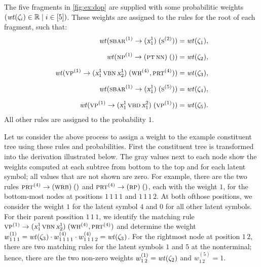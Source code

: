 \documentclass[../../document.tex]{subfiles}
\begin{document}
\begin{example}
        The five fragments in \cref{fig:ex:dop} are supplied with some probabilitic weights \((\mathit{wt}(\zeta_i) \in \mathbb{R} \mid i \in [5])\).
        These weights are assigned to the  rules for the root of each fragment, such that:
        \begin{align*}
            \mathit{wt}(\textsc{sbar}^{(1)} \to (\textsl{x}^1_1)\;(\textsc{s}^{(2)})) &= \mathit{wt}(\zeta_1), \\[.2cm]
            \mathit{wt}(\textsc{np}^{(1)} \to (\textsc{pt}\,\textsc{nn})\;()) &= \mathit{wt}(\zeta_2), \\[.2cm]
            \mathit{wt}(\textsc{vp}^{(1)} \to (\textsl{x}_1^1\,\textsc{vbn}\,\textsl{x}_2^1)\;(\textsc{wh}^{(4)}, \textsc{prt}^{(4)})) &= \mathit{wt}(\zeta_3), \\[.2cm]
            \mathit{wt}(\textsc{sbar}^{(1)} \to (\textsl{x}^1_1)\;(\textsc{s}^{(5)})) &= \mathit{wt}(\zeta_4),  \\[.2cm]
            \mathit{wt}(\textsc{vp}^{(1)} \to (\textsl{x}^1_1\,\textsc{vbd}\,\textsl{x}_1^2)\;(\textsc{vp}^{(1)})) &= \mathit{wt}(\zeta_5) \text{.}
        \end{align*}
        All other rules are assigned to the probability \(1\).

        Let us consider the above process to assign a weight to the example constituent tree using these rules and probabilities.
        First the constituent tree is transformed into the derivation illustrated below.
        The gray values next to each node show the weights computed at each subtree from bottom to the top and for each latent symbol; all values that are not shown are zero.
        For example, there are the two rules \(\textsc{prt}^{(4)} \to (\textsc{wrb})\;()\) and  \(\textsc{prt}^{(4)} \to (\textsc{rp})\;()\), each with the weight \(1\), for the bottom-most nodes at positions \(1\,1\,1\,1\) and \(1\,1\,1\,2\).
        At both ofthose positions, we consider the weight \(1\) for the latent symbol \(4\) and \(0\) for all other latent symbols.
        For their parent possition \(1\,1\,1\), we identify the matching rule \(\textsc{vp}^{(1)} \to (\textsl{x}_1^1\,\textsc{vbn}\,\textsl{x}_2^1)\;(\textsc{wh}^{(4)}, \textsc{prt}^{(4)})\) and determine the weight \(w_{1\,1\,1}^{(1)} = \mathit{wt}(\zeta_3) \cdot w_{1\,1\,1\,1}^{(4)} \cdot w_{1\,1\,1\,2}^{(4)} = \mathit{wt}(\zeta_3)\).
        For the rightmost node at position \(1\,2\), there are two matching rules for the latent symbols \(1\) and \(5\) at the  nonterminal; hence, there are the two non-zero weights \(w_{1\,2}^{(1)} = \mathit{wt}(\zeta_2)\) and \(w_{1\,2}^{(5)} = 1\).

        \vspace{.5cm}

        \null\hfill{}
        
        \hfill\exampleqed

    \end{example}
\end{document}
